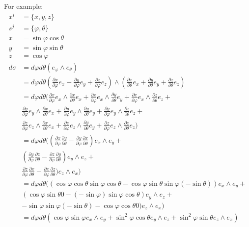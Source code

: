 \begin{remark}
	For example:
	\begin{align*}
		x^i &= \{x,y,z\} \\
		s^j &= \{\varphi, \theta\} \\
		x &= \sin \varphi \cos \theta \\ 
		y &= \sin \varphi \sin \theta \\ 
		z &= \cos \varphi \\ 
		d\sigma &= d\varphi d\theta (e_\varphi \wedge e_\theta) \\
		&=d\varphi d\theta \left(\frac{\partial x}{\partial \varphi} e_x + \frac{\partial y}{\partial \varphi} e_y + \frac{\partial z}{\partial \varphi} e_z\right) \wedge \left(\frac{\partial x}{\partial \theta} e_x + \frac{\partial y}{\partial \theta} e_y + \frac{\partial z}{\partial \theta} e_z\right) \\
		&=d\varphi d\theta (
\frac{\partial x}{\partial \varphi} e_x \wedge \frac{\partial x}{\partial \theta} e_x +
\frac{\partial x}{\partial \varphi} e_x \wedge \frac{\partial y}{\partial \theta} e_y +
\frac{\partial x}{\partial \varphi} e_x \wedge \frac{\partial z}{\partial \theta} e_z + \\
&\frac{\partial y}{\partial \varphi} e_y \wedge \frac{\partial x}{\partial \theta} e_x +
\frac{\partial y}{\partial \varphi} e_y \wedge \frac{\partial y}{\partial \theta} e_y +
\frac{\partial y}{\partial \varphi} e_y \wedge \frac{\partial z}{\partial \theta} e_z + \\
&\frac{\partial z}{\partial \varphi} e_z \wedge \frac{\partial x}{\partial \theta} e_x +
\frac{\partial z}{\partial \varphi} e_z \wedge \frac{\partial y}{\partial \theta} e_y + 
\frac{\partial z}{\partial \varphi} e_z \wedge \frac{\partial z}{\partial \theta} e_z ) \\
		&=d\varphi d\theta ((
\frac{\partial x}{\partial \varphi} \frac{\partial y}{\partial \theta} - \frac{\partial y}{\partial \varphi}\frac{\partial x}{\partial \theta}) e_x \wedge e_y + \\
& (\frac{\partial y}{\partial \varphi} \frac{\partial z}{\partial \theta} - \frac{\partial z}{\partial \varphi} \frac{\partial y}{\partial \theta}) e_y \wedge e_z + \\
&\frac{\partial z}{\partial \varphi} \frac{\partial x}{\partial \theta} - \frac{\partial x}{\partial \varphi} \frac{\partial z}{\partial \theta}) e_z \wedge e_x ) \\
		&=d\varphi d\theta ((
\cos \varphi \cos \theta \sin \varphi \cos \theta - \cos \varphi \sin \theta \sin \varphi (-\sin \theta)) e_x \wedge e_y + \\
& (\cos \varphi \sin \theta  0 - (- \sin \varphi) \sin \varphi \cos \theta) e_y \wedge e_z + \\
& - \sin \varphi \sin \varphi (-\sin \theta) - \cos \varphi \cos \theta 0) e_z \wedge e_x ) \\
		&=d\varphi d\theta (\cos \varphi \sin \varphi e_x \wedge e_y +
\sin^2 \varphi \cos \theta e_y \wedge e_z +
\sin^2 \varphi \sin \theta e_z \wedge e_x )
	\end{align*}
\end{remark}


